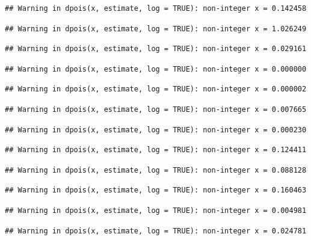 \documentclass[]{article}
\begin{document}
\begin{verbatim}
## Warning in dpois(x, estimate, log = TRUE): non-integer x = 0.142458
\end{verbatim}

\begin{verbatim}
## Warning in dpois(x, estimate, log = TRUE): non-integer x = 1.026249
\end{verbatim}

\begin{verbatim}
## Warning in dpois(x, estimate, log = TRUE): non-integer x = 0.029161
\end{verbatim}

\begin{verbatim}
## Warning in dpois(x, estimate, log = TRUE): non-integer x = 0.000000
\end{verbatim}

\begin{verbatim}
## Warning in dpois(x, estimate, log = TRUE): non-integer x = 0.000002
\end{verbatim}

\begin{verbatim}
## Warning in dpois(x, estimate, log = TRUE): non-integer x = 0.007665
\end{verbatim}

\begin{verbatim}
## Warning in dpois(x, estimate, log = TRUE): non-integer x = 0.000230
\end{verbatim}

\begin{verbatim}
## Warning in dpois(x, estimate, log = TRUE): non-integer x = 0.124411
\end{verbatim}

\begin{verbatim}
## Warning in dpois(x, estimate, log = TRUE): non-integer x = 0.088128
\end{verbatim}

\begin{verbatim}
## Warning in dpois(x, estimate, log = TRUE): non-integer x = 0.160463
\end{verbatim}

\begin{verbatim}
## Warning in dpois(x, estimate, log = TRUE): non-integer x = 0.004981
\end{verbatim}

\begin{verbatim}
## Warning in dpois(x, estimate, log = TRUE): non-integer x = 0.024781
\end{verbatim}
\end{document}
